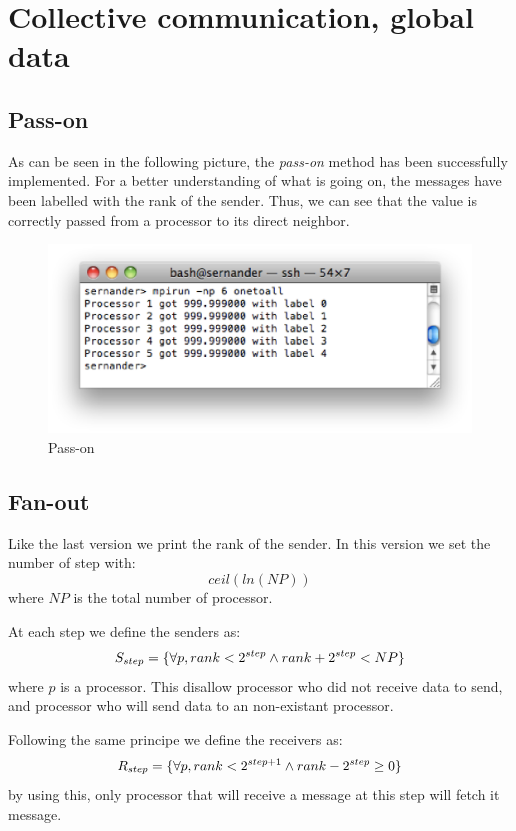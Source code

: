 \chapter{Collective communication, global data}

\section{Pass-on}

As can be seen in the following picture, the \textit{pass-on} method has been successfully implemented. For a better understanding of what is going on, the messages have been labelled with the rank of the sender. Thus, we can see that the value is correctly passed from a processor to its direct neighbor.
\begin{figure}[!h]
\begin{center}
	\includegraphics[width=\textwidth]{pic/passon.eps}
	\caption{Pass-on}
\end{center}
\end{figure}

\section{Fan-out}

Like the last version we print the rank of the sender. In this version we set the number of step with:
$$ceil(ln(NP))$$
where $NP$ is the total number of processor.

At each step we define the senders as:
$$S_{step}=\{\forall p, rank < 2^{step} \wedge rank + 2^{step} < NP\}$$
where $p$ is a processor. This disallow processor who did not receive data to send, and processor who will send data to an non-existant processor.

Following the same principe we define the receivers as:
$$R_{step}=\{\forall p, rank < 2^{step+1} \wedge rank - 2^{step} \ge 0\}$$
by using this, only processor that will receive a message at this step will fetch it message.\\

